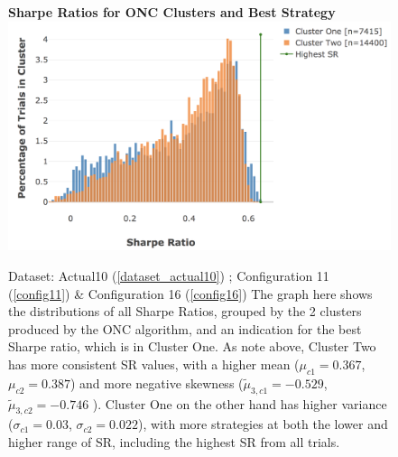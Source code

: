\documentclass[a4paper,11pt,oneside]{article}
\theoremstyle{plain}
\theoremstyle{definition}
\begin{document}
	\begin{figure}[H]
		\centering
		\textbf{Sharpe Ratios for ONC Clusters and Best Strategy}
		\includegraphics[scale=0.45]{images/results/8_10_dsr/cluster_distributions.png} 
		\caption[Sharpe Ratios for ONC Clusters and Best Strategy]{Dataset: Actual10 (\ref{dataset_actual10}) ; Configuration 11 (\ref{config11}) \&  Configuration 16 (\ref{config16}) 
			 \newline The graph here shows the distributions of all Sharpe Ratios, grouped by the 2 clusters produced by the ONC algorithm, and an indication for the best Sharpe ratio, which is in Cluster One. As note above, Cluster Two has more consistent SR values, with a higher mean ($\mu_{c1} = 0.367$, $\mu_{c2} = 0.387$) and more negative skewness ($\tilde{\mu}_{3,c1} = -0.529$, $\tilde{\mu}_{3,c2} = -0.746$ ). Cluster One on the other hand has higher variance ($\sigma_{c1} = 0.03$, $\sigma_{c2} = 0.022$), with more strategies at both the lower and higher range of SR, including the highest SR from all trials.}
		\label{figure-dsr_clusters}
	\end{figure}
\end{document}
